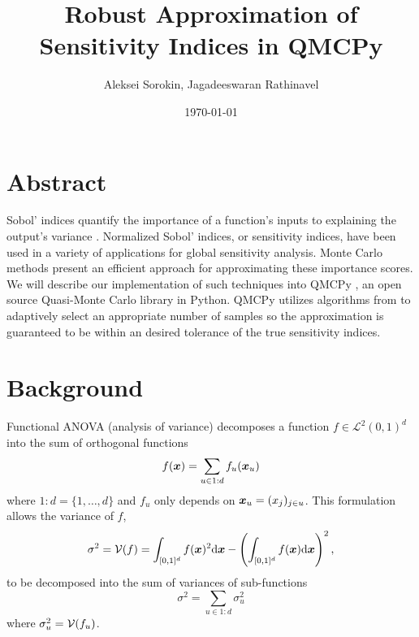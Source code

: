 \documentclass{article}
\title{Robust Approximation of Sensitivity Indices in QMCPy}
\author{Aleksei Sorokin, Jagadeeswaran Rathinavel}
\date{\today}
\begin{document}
\maketitle

\section{Abstract}

Sobol' indices quantify the importance of a function's inputs to explaining the output's variance \cite[Appendix A]{mcbook}.  Normalized Sobol' indices, or sensitivity indices, have been used in a variety of applications for global sensitivity analysis. Monte Carlo methods present an efficient approach for approximating these importance scores. We will describe our implementation of such techniques into QMCPy \cite{QMCPy}, an open source Quasi-Monte Carlo library in Python. QMCPy utilizes algorithms from \cite{reliable_sobol_indices_approx} to adaptively select an appropriate number of samples so the approximation is guaranteed to be within an desired tolerance of the true sensitivity indices. 

\section{Background}

Functional ANOVA (analysis of variance) decomposes a function $f \in \mathcal{L}^2(0,1)^d$ into the sum of orthogonal functions
\begin{equation}
    f(\boldsymbol{x}) = \sum_{u \in 1:d} f_u(\boldsymbol{x}_u)
\end{equation}
\cite[Appendix A]{mcbook} where $1:d = \{1,\dots,d\}$ and $f_u$ only depends on $\boldsymbol{x}_u = (x_j)_{j \in u}$. This formulation allows the variance of $f$,
\begin{equation}
    \sigma^2 = \mathcal{V}(f) =
    \int_{[0,1]^d} f(\boldsymbol{x})^2 \mathrm{d} \boldsymbol{x} - \left(\int_{[0,1]^d}f(\boldsymbol{x})\mathrm{d}\boldsymbol{x}\right)^2,
\end{equation} 
to be decomposed into the sum of variances of sub-functions
\begin{equation}
    \sigma^2 = \sum_{u \in 1:d} \sigma^2_u
\end{equation}
where $\sigma_u^2 = \mathcal{V}(f_u)$. 
\end{document}
